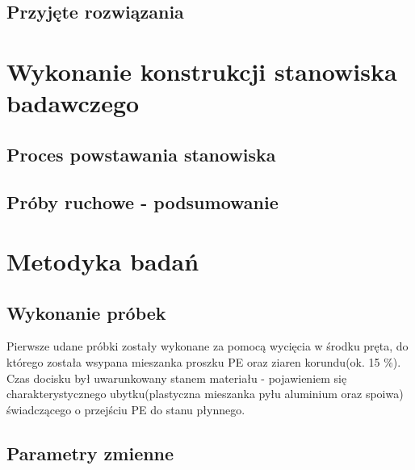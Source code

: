 \documentclass[magister,druk]{dyplom}
\begin{document}
\section{Przyjęte rozwiązania}

\chapter{Wykonanie konstrukcji stanowiska badawczego}
\section{Proces powstawania stanowiska}
\section{Próby ruchowe - podsumowanie}

\chapter{Metodyka badań}
\section{Wykonanie próbek}

Pierwsze udane próbki zostały wykonane za pomocą wycięcia w środku pręta, do którego została wsypana mieszanka proszku PE oraz ziaren korundu(ok. 15 \%). Czas docisku był uwarunkowany stanem materiału - pojawieniem się charakterystycznego ubytku(plastyczna mieszanka pyłu aluminium oraz spoiwa) świadczącego o przejściu PE do stanu płynnego. 

\section{Parametry zmienne}
\end{document}
